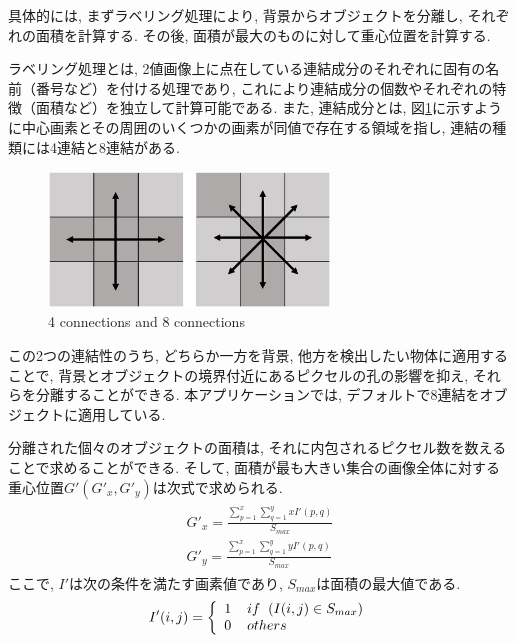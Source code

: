 \documentclass{suribt}
\begin{document}
具体的には, まずラベリング処理により, 背景からオブジェクトを分離し, それぞれの面積を計算する. その後, 面積が最大のものに対して重心位置を計算する. 

ラベリング処理とは, 2値画像上に点在している連結成分のそれぞれに固有の名前（番号など）を付ける処理であり, これにより連結成分の個数やそれぞれの特徴（面積など）を独立して計算可能である. また, 連結成分とは, 図\ref{fig:4conne_and_8conne}に示すように中心画素とその周囲のいくつかの画素が同値で存在する領域を指し, 連結の種類には4連結と8連結がある. 
\begin{figure}[ht]
	\begin{center}
		\includegraphics[width=75mm,clip]{./figure/gazou.eps}
		\caption{4 connections and 8 connections}
		\label{fig:4conne_and_8conne}
	\end{center}
\end{figure}
この2つの連結性のうち, どちらか一方を背景, 他方を検出したい物体に適用することで, 背景とオブジェクトの境界付近にあるピクセルの孔の影響を抑え, それらを分離することができる. 本アプリケーションでは, デフォルトで8連結をオブジェクトに適用している. 

分離された個々のオブジェクトの面積は, それに内包されるピクセル数を数えることで求めることができる. そして, 面積が最も大きい集合の画像全体に対する重心位置$G'(G'_x, G'_y)$は次式で求められる.
\begin{align}
	\begin{aligned}
		\label{COG_of_Image'}
	G'_x = \frac{\sum_{p=1}^x \sum_{q=1}^y xI'(p, q)}{S_{max}}\\
	G'_y = \frac{\sum_{p=1}^x \sum_{q=1}^y yI'(p, q)}{S_{max}}
	\end{aligned}
\end{align}
ここで, $I'$は次の条件を満たす画素値であり, $S_{max}$は面積の最大値である.
\begin{equation}
	I'(i, j) = \left\{
		\begin{array}{l}
			1 \hspace{4mm} if \hspace{2mm} (I(i, j) \in S_{max})\\
			0 \hspace{4mm} others
		\end{array}
		\right.
\end{equation}
\end{document}
